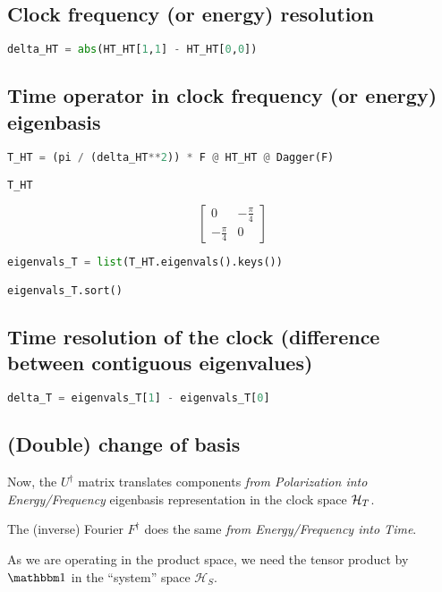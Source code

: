 \subsection*{Clock frequency (or energy) resolution}

\begin{lstlisting}[language=Python]
delta_HT = abs(HT_HT[1,1] - HT_HT[0,0])
\end{lstlisting}

\subsection*{Time operator in clock frequency (or energy) eigenbasis}

\begin{lstlisting}[language=Python]
T_HT = (pi / (delta_HT**2)) * F @ HT_HT @ Dagger(F) 

T_HT
\end{lstlisting}
$$
  \left[\begin{matrix}0 & - \frac{\pi}{4}\\- \frac{\pi}{4} & 0\end{matrix}\right]
$$
\begin{lstlisting}[language=Python]
eigenvals_T = list(T_HT.eigenvals().keys())

eigenvals_T.sort()
\end{lstlisting}

\subsection*{Time resolution of the clock (difference between contiguous eigenvalues)}

\begin{lstlisting}[language=Python]
delta_T = eigenvals_T[1] - eigenvals_T[0]
\end{lstlisting}

\subsection*{(Double) change of basis}

Now, the $U^{\dagger}$ matrix translates components \emph{from Polarization into Energy/Frequency} eigenbasis representation
in the clock space $\mathcal{H}_T$.

The (inverse) Fourier $F^{\dagger}$ does the same \emph{from Energy/Frequency into Time}.

As we are operating in the product space, we need the tensor product by $\idop$ in the ``system'' space $\mathcal{H}_S$.

